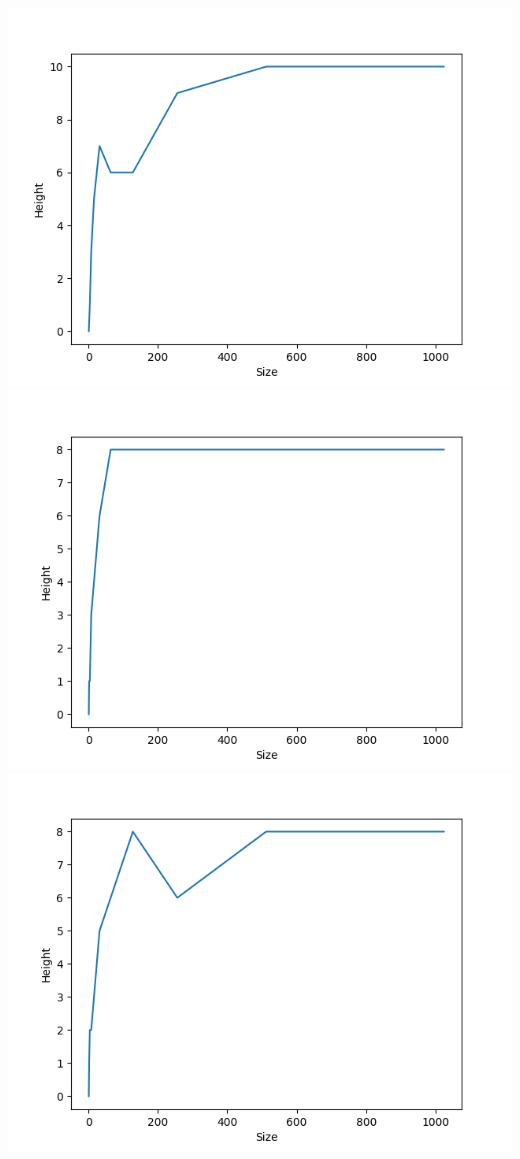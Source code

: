 \documentclass[]{article}
\begin{document}
\includegraphics[scale=0.5]{krusk_height_p=06.png}
\includegraphics[scale=0.5]{krusk_height_p=08.png}
\includegraphics[scale=0.5]{krusk_height_p=1.png}\\
\end{document}
